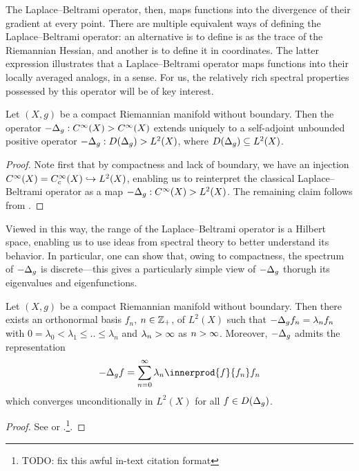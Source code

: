 \documentclass[11pt]{book}
\begin{document}
The Laplace--Beltrami operator, then, maps functions into the divergence of their gradient at every point.
There are multiple equivalent ways of defining the Laplace--Beltrami operator: an alternative is to define is as the trace of the Riemannian Hessian, and another is to define it in coordinates.
The latter expression illustrates that a Laplace--Beltrami operator maps functions into their locally averaged analogs, in a sense.
For us, the relatively rich spectral properties possessed by this operator will be of key interest.

\begin{result}
Let $(X,g)$ be a compact Riemannian manifold without boundary.
Then the operator $-\Delta_g : C^\infty(X) \-> C^\infty(X)$ extends uniquely to a self-adjoint unbounded positive operator $-\Delta_g: D(\Delta_g) \-> L^2(X)$, where $D(\Delta_g) \subseteq L^2(X)$.
\end{result}

\begin{proof}
Note first that by compactness and lack of boundary, we have an injection $C^\infty(X) = C^\infty_c(X) \hookrightarrow L^2(X)$, enabling us to reinterpret the classical Laplace--Beltrami operator as a map $-\Delta_g : C^\infty(X) \-> L^2(X)$.
The remaining claim follows from \textcite[Theorem 2.4]{strichartz83}.
\end{proof}

Viewed in this way, the range of the Laplace--Beltrami operator is a Hilbert space, enabling us to use ideas from spectral theory to better understand its behavior.
In particular, one can show that, owing to compactness, the spectrum of $-\Delta_g$ is discrete---this gives a particularly simple view of $-\Delta_g$ thorugh its eigenvalues and eigenfunctions.

\begin{result}
Let $(X,g)$ be a compact Riemannian manifold without boundary.
Then there exists an orthonormal basis $f_n$, $n\in\mathbb{Z}_+$, of $L^2(X)$ such that $-\Delta_g f_n = \lambda_n f_n$ with $0 = \lambda_0 < \lambda_1 \leq .. \leq \lambda_n$ and $\lambda_n\-> \infty$ as $n\->\infty$.
Moreover, $-\Delta_g$ admits the representation
\[
-\lap_g f = \sum_{n=0}^\infty \lambda_n \innerprod{f}{f_n} f_n
\]
which converges unconditionally in $L^2(X)$ for all $f \in D(\Delta_g)$.
\end{result}

\begin{proof}
See \textcite[page 139]{chavel84} or \textcite[Theorem 44]{canzani13}.\footnote{TODO: fix this awful in-text citation format}.
\end{proof}
\end{document}
